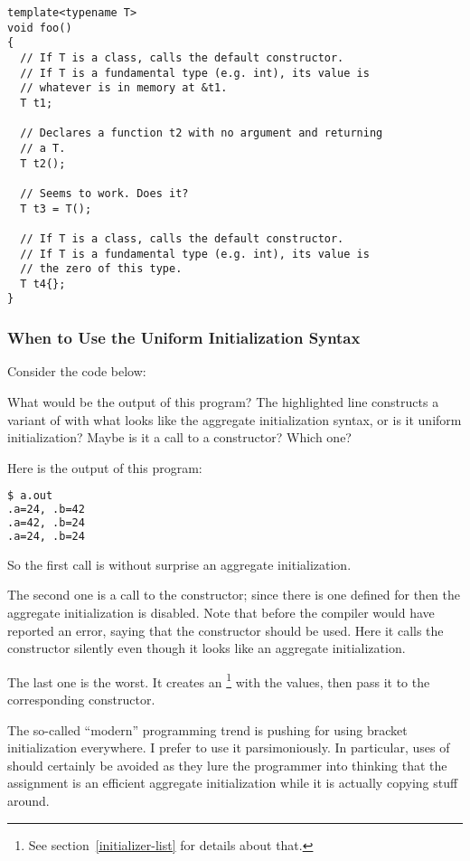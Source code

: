 \begin{lstlisting}
template<typename T>
void foo()
{
  // If T is a class, calls the default constructor.
  // If T is a fundamental type (e.g. int), its value is
  // whatever is in memory at &t1.
  T t1;

  // Declares a function t2 with no argument and returning
  // a T.
  T t2();

  // Seems to work. Does it?
  T t3 = T();

  // If T is a class, calls the default constructor.
  // If T is a fundamental type (e.g. int), its value is
  // the zero of this type.
  T t4{};
}
\end{lstlisting}

\subsubsection{When to Use the Uniform Initialization Syntax}

Consider the code below:


What would be the output of this program? The highlighted line
constructs a variant of  with what looks like the aggregate
initialization syntax, or is it uniform initialization? Maybe is it a
call to a constructor? Which one?

Here is the output of this program:

\begin{lstlisting}[language=bash]
$ a.out
.a=24, .b=42
.a=42, .b=24
.a=24, .b=24
\end{lstlisting}

So the first call is without surprise an aggregate initialization.

The second one is a call to the constructor; since there is one
defined for  then the aggregate initialization
is disabled. Note that before  the compiler would have reported
an error, saying that the constructor should be used. Here it calls
the constructor silently even though it looks like an aggregate
initialization.

The last one is the worst. It creates an 
\footnote{See section~\ref{initializer-list} for details about that.}
with the values, then pass it to the corresponding constructor.

The so-called ``modern'' \cpp{} programming trend is pushing for using
bracket initialization everywhere. I prefer to use it
parsimoniously. In particular, uses of 
should certainly be avoided as they lure the programmer into thinking
that the assignment is an efficient aggregate initialization while it
is actually copying stuff around.

